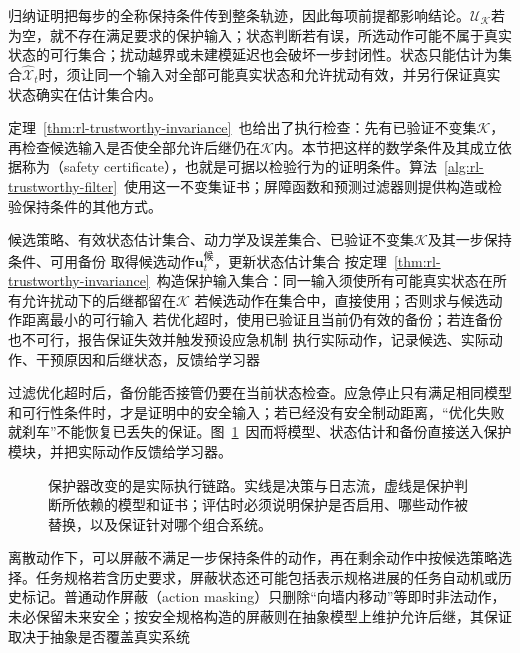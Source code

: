 归纳证明把每步的全称保持条件传到整条轨迹，因此每项前提都影响结论。$\mathcal U_{\mathcal K}$若为空，就不存在满足要求的保护输入；状态判断若有误，所选动作可能不属于真实状态的可行集合；扰动越界或未建模延迟也会破坏一步封闭性。状态只能估计为集合$\widehat{\mathcal X}_t$时，须让同一个输入对全部可能真实状态和允许扰动有效，并另行保证真实状态确实在估计集合内。

定理~\ref{thm:rl-trustworthy-invariance}~也给出了执行检查：先有已验证不变集$\mathcal K$，再检查候选输入是否使全部允许后继仍在$\mathcal K$内。本节把这样的数学条件及其成立依据称为（safety certificate），也就是可据以检验行为的证明条件。算法~\ref{alg:rl-trustworthy-filter}~使用这一不变集证书；屏障函数和预测过滤器则提供构造或检验保持条件的其他方式。

\begin{algorithm}[带可行性检查的安全过滤]
  \label{alg:rl-trustworthy-filter}
  \begin{algorithmic}[1]
    \Require 候选策略、有效状态估计集合、动力学及误差集合、已验证不变集$\mathcal K$及其一步保持条件、可用备份
      \State 取得候选动作$\bm{u}^{\text{候}}_t$，更新状态估计集合
      \State 按定理~\ref{thm:rl-trustworthy-invariance}~构造保护输入集合：同一输入须使所有可能真实状态在所有允许扰动下的后继都留在$\mathcal K$
      \State 若候选动作在集合中，直接使用；否则求与候选动作距离最小的可行输入
      \State 若优化超时，使用已验证且当前仍有效的备份；若连备份也不可行，报告保证失效并触发预设应急机制
      \State 执行实际动作，记录候选、实际动作、干预原因和后继状态，反馈给学习器
    \EndFor
  \end{algorithmic}
\end{algorithm}

过滤优化超时后，备份能否接管仍要在当前状态检查。应急停止只有满足相同模型和可行性条件时，才是证明中的安全输入；若已经没有安全制动距离，“优化失败就刹车”不能恢复已丢失的保证。图~\ref{fig:rl-trustworthy-filter}~因而将模型、状态估计和备份直接送入保护模块，并把实际动作反馈给学习器。

\begin{figure}[t]
  \centering
  
  \caption{保护器改变的是实际执行链路。实线是决策与日志流，虚线是保护判断所依赖的模型和证书；评估时必须说明保护是否启用、哪些动作被替换，以及保证针对哪个组合系统。}
  \label{fig:rl-trustworthy-filter}
\end{figure}

离散动作下，可以屏蔽不满足一步保持条件的动作，再在剩余动作中按候选策略选择。任务规格若含历史要求，屏蔽状态还可能包括表示规格进展的任务自动机或历史标记。普通动作屏蔽（action masking）只删除“向墙内移动”等即时非法动作，未必保留未来安全；按安全规格构造的屏蔽则在抽象模型上维护允许后继，其保证取决于抽象是否覆盖真实系统

